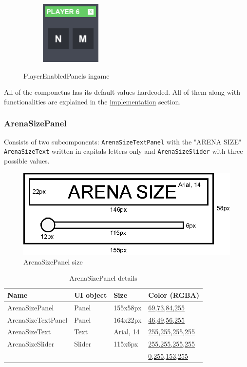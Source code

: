 \begin{figure}[h!]
\begin{subfigure}{0.195\textwidth}
	\end{subfigure}
	\begin{subfigure}{0.195\textwidth}
		\centering
		\includegraphics[scale=1, frame]{gui-imgs/player6enabledpanel}
	\end{subfigure}
	\caption{PlayerEnabledPanels ingame}
\end{figure}

\noindent All of the componetns has its default values hardcoded. All of them along with functionalities are explained in the \hyperref[gui-implementation]{implementation} section.

\subsubsection{ArenaSizePanel}\label{gui-arenasizepanel}
\noindent Consists of two subcomponents: \verb|ArenaSizeTextPanel| with the "ARENA SIZE" \verb|ArenaSizeText| written in capitals letters only and \verb|ArenaSizeSlider| with three possible values.

\begin{figure}[h!]\centering
	\hspace*{.75cm}\includegraphics[scale=1]{gui-imgs/arenasizepanel-size}
	\caption{ArenaSizePanel size}
\end{figure}

\newpage
\begin{table}[h!]\centering
	\caption{ArenaSizePanel details}
	\begin{tabular}{|C{4cm}|C{4cm}|C{4cm}|C{4cm}|}
		\hline
		\textbf{Name} & \textbf{UI object} & \textbf{Size} & \textbf{Color (RGBA)} \\\hline
		ArenaSizePanel & Panel & 155x58px & \hyperref[gui-colors]{69,73,84,255} \\\hline
		ArenaSizeTextPanel & Panel & 164x22px & \hyperref[gui-colors]{46,49,56,255} \\\hline
		ArenaSizeText & Text & Arial, 14 & \hyperref[gui-colors]{255,255,255,255} \\\hline
		ArenaSizeSlider & Slider & 115x6px & \hyperref[gui-colors]{255,255,255,255} \\
		& & & \hyperref[gui-colors]{0,255,153,255} \\\hline
	\end{tabular}
\end{table}

